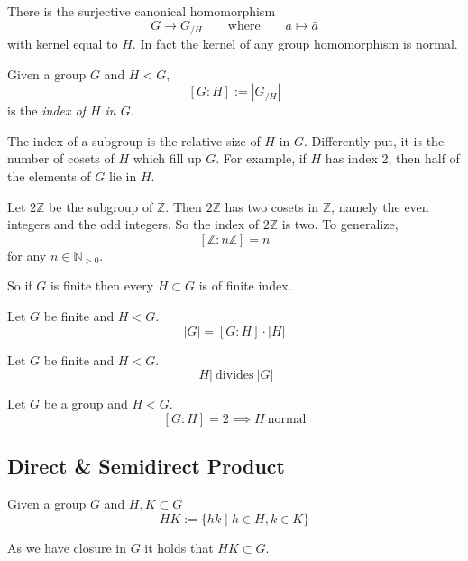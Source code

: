 There is the surjective canonical homomorphism \[G \to G_{/H} \qquad\text{where}\qquad a \mapsto \bar{a}\]
with kernel equal to \(H\).
In fact the kernel of any group homomorphism is normal.

\begin{definition}
   Given a group \(G\) and \(H < G\),
   \[[G:H] := |G_{/H}|\]
   is the \emph{index of \(H\) in \(G\)}.
\end{definition}
\begin{remark}[Intuition]
   The index of a subgroup is the relative size of \(H\) in \(G\).
   Differently put, it is the number of cosets of \(H\) which fill up \(G\).
   For example, if \(H\) has index 2, then half of the elements of \(G\) lie in \(H\).
\end{remark}
\begin{example}
   Let \(2\mathbb{Z}\) be the subgroup of \(\mathbb{Z}\).
   Then \(2\mathbb{Z}\) has two cosets in \(\mathbb{Z}\), namely the even integers and the odd integers.
   So the index of \(2\mathbb{Z}\) is two.
   To generalize,
   \[[\mathbb{Z} : n\mathbb{Z}] = n\]
   for any \(n \in \mathbb{N}_{>0}\).
\end{example}
\begin{remark}
   So if \(G\) is finite then every \(H \subset G\) is of finite index.
\end{remark}

\begin{proposition}\label{pro:index_formula}
   Let \(G\) be finite and \(H < G\).
   \[|G| = [G:H] \cdot |H|\]
\end{proposition}

\begin{corollary}
   Let \(G\) be finite and \(H < G\).
   \[|H|~\text{divides}~|G|\]
\end{corollary}

\begin{proposition}
   Let \(G\) be a group and \(H < G\).
   \[[G:H] = 2 \implies H~\text{normal}\]
\end{proposition}

\subsection{Direct \& Semidirect Product}
\begin{definition}
   Given a group \(G\) and \(H, K \subset G\)
   \[HK := \{hk \mid h \in H, k \in K\}\]
\end{definition}
\begin{remark}
   As we have closure in \(G\) it holds that \(HK \subset G\).
\end{remark}

